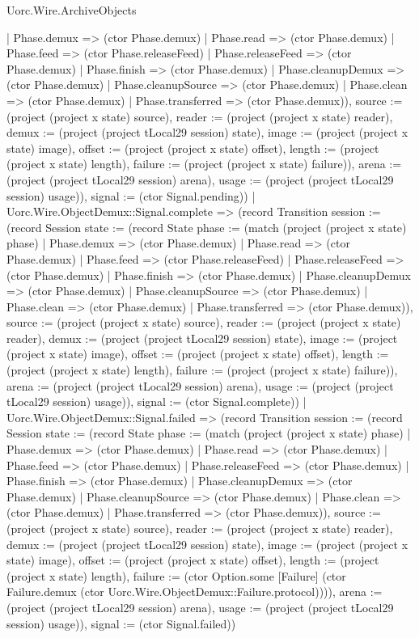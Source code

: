 \begin{lexlean}{Uorc.Wire.ArchiveObjects}
\begin{semanticmodule}
{{{{      | Phase.demux => (ctor Phase.demux)
      | Phase.read => (ctor Phase.demux)
      | Phase.feed => (ctor Phase.releaseFeed)
      | Phase.releaseFeed => (ctor Phase.demux)
      | Phase.finish => (ctor Phase.demux)
      | Phase.cleanupDemux => (ctor Phase.demux)
      | Phase.cleanupSource => (ctor Phase.demux)
      | Phase.clean => (ctor Phase.demux)
      | Phase.transferred => (ctor Phase.demux)), source := (project (project x state) source), reader := (project (project x state) reader), demux := (project (project tLocal29 session) state), image := (project (project x state) image), offset := (project (project x state) offset), length := (project (project x state) length), failure := (project (project x state) failure)}), arena := (project (project tLocal29 session) arena), usage := (project (project tLocal29 session) usage)}), signal := (ctor Signal.pending)})
    | Uorc.Wire.ObjectDemux::Signal.complete => (record Transition {session := (record Session {state := (record State {phase := (match (project (project x state) phase)
      | Phase.demux => (ctor Phase.demux)
      | Phase.read => (ctor Phase.demux)
      | Phase.feed => (ctor Phase.releaseFeed)
      | Phase.releaseFeed => (ctor Phase.demux)
      | Phase.finish => (ctor Phase.demux)
      | Phase.cleanupDemux => (ctor Phase.demux)
      | Phase.cleanupSource => (ctor Phase.demux)
      | Phase.clean => (ctor Phase.demux)
      | Phase.transferred => (ctor Phase.demux)), source := (project (project x state) source), reader := (project (project x state) reader), demux := (project (project tLocal29 session) state), image := (project (project x state) image), offset := (project (project x state) offset), length := (project (project x state) length), failure := (project (project x state) failure)}), arena := (project (project tLocal29 session) arena), usage := (project (project tLocal29 session) usage)}), signal := (ctor Signal.complete)})
    | Uorc.Wire.ObjectDemux::Signal.failed => (record Transition {session := (record Session {state := (record State {phase := (match (project (project x state) phase)
      | Phase.demux => (ctor Phase.demux)
      | Phase.read => (ctor Phase.demux)
      | Phase.feed => (ctor Phase.demux)
      | Phase.releaseFeed => (ctor Phase.demux)
      | Phase.finish => (ctor Phase.demux)
      | Phase.cleanupDemux => (ctor Phase.demux)
      | Phase.cleanupSource => (ctor Phase.demux)
      | Phase.clean => (ctor Phase.demux)
      | Phase.transferred => (ctor Phase.demux)), source := (project (project x state) source), reader := (project (project x state) reader), demux := (project (project tLocal29 session) state), image := (project (project x state) image), offset := (project (project x state) offset), length := (project (project x state) length), failure := (ctor Option.some [Failure] (ctor Failure.demux (ctor Uorc.Wire.ObjectDemux::Failure.protocol)))}), arena := (project (project tLocal29 session) arena), usage := (project (project tLocal29 session) usage)}), signal := (ctor Signal.failed)})
}
\end{semanticmodule}
\end{lexlean}
